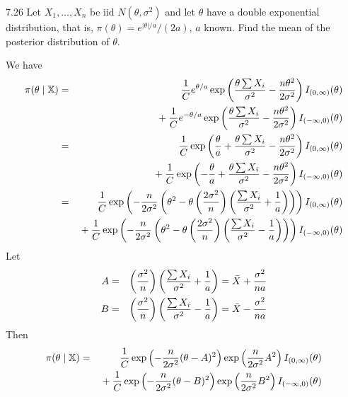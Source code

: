 \documentclass[12pt]{article}
\begin{document}
7.26
Let $X_1,\ldots,X_n$ be iid $N(\theta,\sigma^2)$ and let $\theta$
have a double exponential distribution, that is,
$\pi(\theta)=e^{|\theta|/a}/(2a)$, $a$ known.
Find the mean of the posterior distribution of $\theta$.

\bigskip
\noindent
We have
\begin{eqnarray*}
\pi({\theta\mid\mathbb X})
&=&
{1\over C}e^{\theta/a}\exp\left(
{\theta\sum X_i\over\sigma^2}-{n\theta^2\over2\sigma^2}
\right)
I_{(0,\infty)}(\theta)
\\
&&{}+
{1\over C}e^{-\theta/a}\exp\left(
{\theta\sum X_i\over\sigma^2}-{n\theta^2\over2\sigma^2}
\right)
I_{(-\infty,0)}(\theta)
\\
&=&
{1\over C}\exp\left({\theta\over a}+
{\theta\sum X_i\over\sigma^2}-{n\theta^2\over2\sigma^2}
\right)
I_{(0,\infty)}(\theta)
\\
&&{}+
{1\over C}\exp\left(-{\theta\over a}+
{\theta\sum X_i\over\sigma^2}-{n\theta^2\over2\sigma^2}
\right)
I_{(-\infty,0)}(\theta)
\\
&=&
{1\over C}\exp\left(
-{n\over2\sigma^2}
\left(
\theta^2-\theta
\left({2\sigma^2\over n}\right)
\left({\sum X_i\over\sigma^2}+{1\over a}\right)
\right)
\right)I_{(0,\infty)}(\theta)
\\
&&{}+
{1\over C}\exp\left(
-{n\over2\sigma^2}
\left(
\theta^2-\theta
\left({2\sigma^2\over n}\right)
\left({\sum X_i\over\sigma^2}-{1\over a}\right)
\right)
\right)I_{(-\infty,0)}(\theta)
\end{eqnarray*}
Let
\begin{eqnarray*}
A&=&\left({\sigma^2\over n}\right)
\left({\sum X_i\over\sigma^2}+{1\over a}\right)
=\bar X+{\sigma^2\over na}\\
B&=&\left({\sigma^2\over n}\right)
\left({\sum X_i\over\sigma^2}-{1\over a}\right)
=\bar X-{\sigma^2\over na}
\end{eqnarray*}
Then
\begin{eqnarray*}
\pi(\theta\mid\mathbb X)&=&
{1\over C}\exp\left(-{n\over2\sigma^2}(\theta-A)^2\right)
\exp\left({n\over2\sigma^2}A^2\right)
I_{(0,\infty)}(\theta)\\
&&{}+
{1\over C}\exp\left(-{n\over2\sigma^2}(\theta-B)^2\right)
\exp\left({n\over2\sigma^2}B^2\right)
I_{(-\infty,0)}(\theta)\\
%
\end{eqnarray*}
\end{document}
